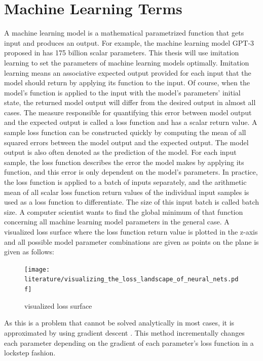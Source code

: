 \documentclass[draft,final]{vutinfth} %
\begin{document}
    \section{Machine Learning Terms}
    A machine learning model is a mathematical parametrized function that gets input and produces an output.
    For example, the machine learning model GPT-3 proposed in \cite{GPT-3} has 175 billion scalar parameters.
    This thesis will use imitation learning to set the parameters of machine learning models optimally.
    Imitation learning means an associative expected output provided for each input that the model should return by applying its function to the input.
    Of course, when the model's function is applied to the input with the model's parameters' initial state, the returned model output will differ from the desired output in almost all cases.
    The measure responsible for quantifying this error between model output and the expected output is called a loss function and has a scalar return value.
    A sample loss function can be constructed quickly by computing the mean of all squared errors between the model output and the expected output.
    The model output is also often denoted as the prediction of the model.
    For each input sample, the loss function describes the error the model makes by applying its function, and this error is only dependent on the model's parameters.
    In practice, the loss function is applied to a batch of inputs separately, and the arithmetic mean of all scalar loss function return values of the individual input samples is used as a loss function to differentiate.
    The size of this input batch is called batch size.
    A computer scientist wants to find the global minimum of that function concerning all machine learning model parameters in the general case.
    A visualized loss surface where the loss function return value is plotted in the z-axis and all possible model parameter combinations are given as points on the plane is given as follows:
    \begin{figure}[H]
        \centering{}
        \texttt{[image: literature/visualizing\_the\_loss\_landscape\_of\_neural\_nets.pdf]}
        \caption{visualized loss surface \cite[p. 1]{loss_vis}}
        \label{fig:loss_vis}
    \end{figure}
    As this is a problem that cannot be solved analytically in most cases, it is approximated by using gradient descent \cite{GradientDescent}.
    This method incrementally changes each parameter depending on the gradient of each parameter's loss function in a lockstep fashion.
\end{document}
